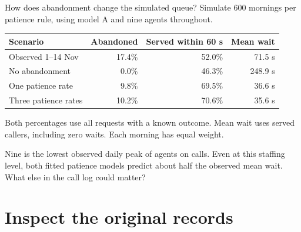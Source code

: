 \documentclass{beamer}
\begin{document}
\begin{frame}{How does abandonment change the simulated queue?}
  \small
  Simulate 600 mornings per patience rule, using model A and nine agents
  throughout.

  \vspace{0.55em}
  \centering
  \begin{tabular}{@{}lrrr@{}}
    \toprule
    Scenario & Abandoned & Served within 60 s & Mean wait\\
    \midrule
    Observed 1--14 Nov  & 17.4\% & 52.0\% &  71.5 s\\
    No abandonment     &  0.0\% & 46.3\% & 248.9 s\\
    One patience rate  &  9.8\% & 69.5\% &  36.6 s\\
    Three patience rates & 10.2\% & 70.6\% &  35.6 s\\
    \bottomrule
  \end{tabular}

  \vspace{0.4em}
  \raggedright
  {\footnotesize Both percentages use all requests with a known outcome.
  Mean wait uses served callers, including zero waits. Each morning has
  equal weight.\par}

  \vspace{0.45em}
  Nine is the lowest observed daily peak of agents on calls. Even at
  this staffing level, both fitted patience models predict about half
  the observed mean wait. What else in the call log could matter?
\end{frame}

\section{Inspect the original records}
\end{document}
